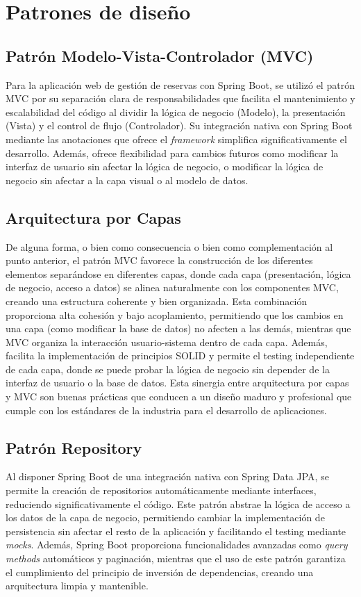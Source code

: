 \section{Patrones de diseño}\label{patron-de-diseño}

\subsection{Patrón Modelo-Vista-Controlador (MVC)}\label{patron-modelo-vista-controlador}
Para la aplicación web de gestión de reservas con Spring Boot, se utilizó el patrón MVC por su separación clara de responsabilidades que facilita el mantenimiento y escalabilidad del código al dividir la lógica de negocio (Modelo), la presentación (Vista) y el control de flujo (Controlador). Su integración nativa con Spring Boot mediante las anotaciones que ofrece el \emph{framework} simplifica significativamente el desarrollo. Además, ofrece flexibilidad para cambios futuros como modificar la interfaz de usuario sin afectar la lógica de negocio, o modificar la lógica de negocio sin afectar a la capa visual o al modelo de datos.

\subsection{Arquitectura por Capas}\label{arquitectura-por-capas}
De alguna forma, o bien como consecuencia o bien como complementación al punto anterior, el patrón MVC favorece la construcción de los diferentes elementos separándose en diferentes capas, donde cada capa (presentación, lógica de negocio, acceso a datos) se alinea naturalmente con los componentes MVC, creando una estructura coherente y bien organizada. Esta combinación proporciona alta cohesión y bajo acoplamiento, permitiendo que los cambios en una capa (como modificar la base de datos) no afecten a las demás, mientras que MVC organiza la interacción usuario-sistema dentro de cada capa. Además, facilita la implementación de principios SOLID y permite el testing independiente de cada capa, donde se puede probar la lógica de negocio sin depender de la interfaz de usuario o la base de datos. Esta sinergia entre arquitectura por capas y MVC son buenas prácticas que conducen a un diseño maduro y profesional que cumple con los estándares de la industria para el desarrollo de aplicaciones.

\subsection{Patrón Repository}\label{patron-repository}
Al disponer Spring Boot de una integración nativa con Spring Data JPA, se permite la creación de repositorios automáticamente mediante interfaces, reduciendo significativamente el código. Este patrón abstrae la lógica de acceso a los datos de la capa de negocio, permitiendo cambiar la implementación de persistencia sin afectar el resto de la aplicación y facilitando el testing mediante \emph{mocks}. Además, Spring Boot proporciona funcionalidades avanzadas como \emph{query methods} automáticos y paginación, mientras que el uso de este patrón garantiza el cumplimiento del principio de inversión de dependencias, creando una arquitectura limpia y mantenible.

